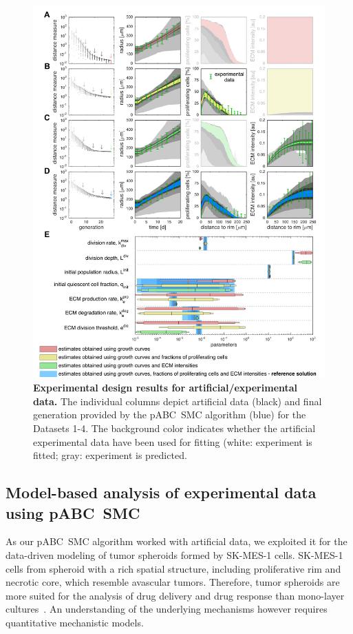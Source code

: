 \documentclass[10pt,letterpaper]{article}
\begin{document}
\begin{figure}[t]
\begin{adjustwidth}{-2in}{0in}
\begin{center}
	\includegraphics{fig__experimental_design__experimental_data}
\end{center}
\caption{{\bf Experimental design results for artificial/experimental data.}
The individual columns depict artificial data (black) and final generation provided by the pABC~SMC algorithm (blue) for the Datasets 1-4. The background color indicates whether the artificial experimental data have been used for fitting (white: experiment is fitted; gray: experiment is predicted.}
\label{fig: experimental design using 2D model}
\end{adjustwidth}
\end{figure}

\subsection*{Model-based analysis of experimental data using pABC~SMC}
As our pABC~SMC algorithm worked with artificial data, we exploited it for the data-driven modeling of tumor spheroids formed by SK-MES-1 cells. SK-MES-1 cells from spheroid with a rich spatial structure, including proliferative rim and necrotic core, which resemble avascular tumors. Therefore, tumor spheroids are more suited for the analysis of drug delivery and drug response than mono-layer cultures~\cite{CarverMin2014,LemmoAte2014}. An understanding of the underlying mechanisms however requires quantitative mechanistic models. 
\end{document}
